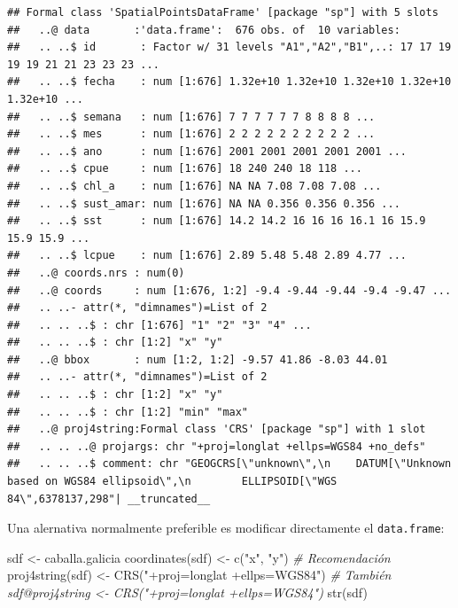 \documentclass[
  spanish,
]{book}
\newenvironment{Shaded}{\begin{snugshade}}{\end{snugshade}}
\newcommand{\CommentTok}[1]{\textcolor[rgb]{0.56,0.35,0.01}{\textit{#1}}}
\newcommand{\FunctionTok}[1]{\textcolor[rgb]{0.00,0.00,0.00}{#1}}
\newcommand{\NormalTok}[1]{#1}
\newcommand{\OtherTok}[1]{\textcolor[rgb]{0.56,0.35,0.01}{#1}}
\newcommand{\StringTok}[1]{\textcolor[rgb]{0.31,0.60,0.02}{#1}}
\theoremstyle{break}
\begin{document}
\begin{verbatim}
## Formal class 'SpatialPointsDataFrame' [package "sp"] with 5 slots
##   ..@ data       :'data.frame':  676 obs. of  10 variables:
##   .. ..$ id       : Factor w/ 31 levels "A1","A2","B1",..: 17 17 19 19 19 21 21 23 23 23 ...
##   .. ..$ fecha    : num [1:676] 1.32e+10 1.32e+10 1.32e+10 1.32e+10 1.32e+10 ...
##   .. ..$ semana   : num [1:676] 7 7 7 7 7 7 8 8 8 8 ...
##   .. ..$ mes      : num [1:676] 2 2 2 2 2 2 2 2 2 2 ...
##   .. ..$ ano      : num [1:676] 2001 2001 2001 2001 2001 ...
##   .. ..$ cpue     : num [1:676] 18 240 240 18 118 ...
##   .. ..$ chl_a    : num [1:676] NA NA 7.08 7.08 7.08 ...
##   .. ..$ sust_amar: num [1:676] NA NA 0.356 0.356 0.356 ...
##   .. ..$ sst      : num [1:676] 14.2 14.2 16 16 16 16.1 16 15.9 15.9 15.9 ...
##   .. ..$ lcpue    : num [1:676] 2.89 5.48 5.48 2.89 4.77 ...
##   ..@ coords.nrs : num(0) 
##   ..@ coords     : num [1:676, 1:2] -9.4 -9.44 -9.44 -9.4 -9.47 ...
##   .. ..- attr(*, "dimnames")=List of 2
##   .. .. ..$ : chr [1:676] "1" "2" "3" "4" ...
##   .. .. ..$ : chr [1:2] "x" "y"
##   ..@ bbox       : num [1:2, 1:2] -9.57 41.86 -8.03 44.01
##   .. ..- attr(*, "dimnames")=List of 2
##   .. .. ..$ : chr [1:2] "x" "y"
##   .. .. ..$ : chr [1:2] "min" "max"
##   ..@ proj4string:Formal class 'CRS' [package "sp"] with 1 slot
##   .. .. ..@ projargs: chr "+proj=longlat +ellps=WGS84 +no_defs"
##   .. .. ..$ comment: chr "GEOGCRS[\"unknown\",\n    DATUM[\"Unknown based on WGS84 ellipsoid\",\n        ELLIPSOID[\"WGS 84\",6378137,298"| __truncated__
\end{verbatim}

Una alernativa normalmente preferible es modificar directamente
el \texttt{data.frame}:

\begin{Shaded}
\begin{Highlighting}[]
\NormalTok{sdf }\OtherTok{\textless{}{-}}\NormalTok{ caballa.galicia}
\FunctionTok{coordinates}\NormalTok{(sdf) }\OtherTok{\textless{}{-}} \FunctionTok{c}\NormalTok{(}\StringTok{"x"}\NormalTok{, }\StringTok{"y"}\NormalTok{) }\CommentTok{\# Recomendación}
\FunctionTok{proj4string}\NormalTok{(sdf) }\OtherTok{\textless{}{-}} \FunctionTok{CRS}\NormalTok{(}\StringTok{"+proj=longlat +ellps=WGS84"}\NormalTok{)  }\CommentTok{\# También sdf@proj4string \textless{}{-} CRS("+proj=longlat +ellps=WGS84")}
\FunctionTok{str}\NormalTok{(sdf)}
\end{Highlighting}
\end{Shaded}
\end{document}
